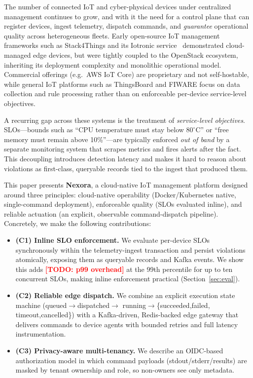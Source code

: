 \documentclass[review,12pt]{elsarticle}
\newcommand{\TODO}[1]{\textcolor{red}{\textbf{[TODO: #1]}}}
\begin{document}
The number of connected IoT and cyber-physical devices under centralized
management continues to grow, and with it the need for a control plane that can
register devices, ingest telemetry, dispatch commands, and \emph{guarantee}
operational quality across heterogeneous fleets. Early open-source IoT
management frameworks such as Stack4Things and its Iotronic
service~\cite{stack4things,iotronic} demonstrated cloud-managed edge devices,
but were tightly coupled to the OpenStack ecosystem, inheriting its deployment
complexity and monolithic operational model. Commercial offerings
(e.g.\ AWS IoT Core) are proprietary and not self-hostable, while general IoT
platforms such as ThingsBoard and FIWARE focus on data collection and rule
processing rather than on enforceable per-device service-level objectives.

A recurring gap across these systems is the treatment of \emph{service-level
objectives}. SLOs---bounds such as ``CPU temperature must stay below
$80^{\circ}$C'' or ``free memory must remain above 10\%''---are typically
enforced \emph{out of band} by a separate monitoring system that scrapes
metrics and fires alerts after the fact. This decoupling introduces detection
latency and makes it hard to reason about violations as first-class,
queryable records tied to the ingest that produced them.

This paper presents \textbf{Nexora}, a cloud-native IoT management platform
designed around three principles: cloud-native operability (Docker/Kubernetes
native, single-command deployment), enforceable quality (SLOs evaluated inline),
and reliable actuation (an explicit, observable command-dispatch pipeline).
Concretely, we make the following contributions:

\begin{itemize}
  \item \textbf{(C1) Inline SLO enforcement.} We evaluate per-device SLOs
  synchronously within the telemetry-ingest transaction and persist violations
  atomically, exposing them as queryable records and Kafka events. We show this
  adds \TODO{p99 overhead} at the 99th percentile for up to ten concurrent
  SLOs, making inline enforcement practical (Section~\ref{sec:eval}).
  \item \textbf{(C2) Reliable edge dispatch.} We combine an explicit execution
  state machine (\textsf{queued}$\rightarrow$\textsf{dispatched}$\rightarrow$%
  \textsf{running}$\rightarrow$\{\textsf{succeeded},\textsf{failed},%
  \textsf{timeout},\textsf{cancelled}\}) with a Kafka-driven, Redis-backed edge
  gateway that delivers commands to device agents with bounded retries and full
  latency instrumentation.
  \item \textbf{(C3) Privacy-aware multi-tenancy.} We describe an OIDC-based
  authorization model in which command payloads (stdout/stderr/results) are
  masked by tenant ownership and role, so non-owners see only metadata.
\end{itemize}
\end{document}
